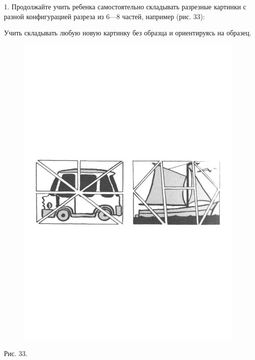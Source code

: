\documentclass[a5paper]{book}
\begin{document}
1. Продолжайте учить ребенка самостоятельно складывать разрезные
картинки с разной конфигурацией разреза из 6---8 частей, например (рис.
33):

Учить складывать любую новую картинку без образца и ориентируясь на
образец.

\begin{figure}
\centering
\includegraphics[width=\linewidth]{media/media/image30.png}
\end{figure}

Рис. 33.
\end{document}
